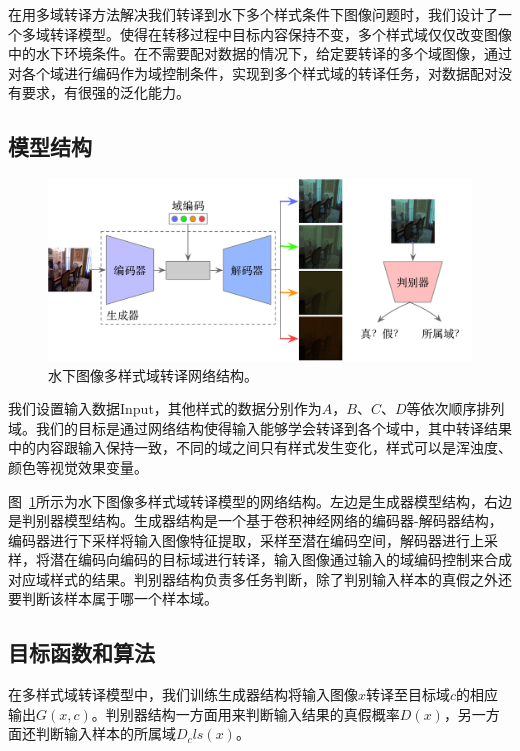 在用多域转译方法解决我们转译到水下多个样式条件下图像问题时，我们设计了一个多域转译模型。使得在转移过程中目标内容保持不变，多个样式域仅仅改变图像中的水下环境条件。在不需要配对数据的情况下，给定要转译的多个域图像，通过对各个域进行编码作为域控制条件，实现到多个样式域的转译任务，对数据配对没有要求，有很强的泛化能力。

\subsection{模型结构}

\begin{figure}[ht]
    \centering
    \includegraphics[width=1\textwidth]{figures/Domain_network.pdf}
    \caption{水下图像多样式域转译网络结构。}
    \label{fig:domain_net}
\end{figure}

我们设置输入数据Input，其他样式的数据分别作为$A$，$B$、$C$、$D$等依次顺序排列域。我们的目标是通过网络结构使得输入能够学会转译到各个域中，其中转译结果中的内容跟输入保持一致，不同的域之间只有样式发生变化，样式可以是浑浊度、颜色等视觉效果变量。

图~\ref{fig:domain_net}所示为水下图像多样式域转译模型的网络结构。左边是生成器模型结构，右边是判别器模型结构。生成器结构是一个基于卷积神经网络的编码器-解码器结构，编码器进行下采样将输入图像特征提取，采样至潜在编码空间，解码器进行上采样，将潜在编码向编码的目标域进行转译，输入图像通过输入的域编码控制来合成对应域样式的结果。判别器结构负责多任务判断，除了判别输入样本的真假之外还要判断该样本属于哪一个样本域。

\subsection{目标函数和算法}
在多样式域转译模型中，我们训练生成器结构将输入图像$x$转译至目标域$c$的相应输出$G(x,c)$。判别器结构一方面用来判断输入结果的真假概率$D(x)$，另一方面还判断输入样本的所属域$D_cls(x)$。

